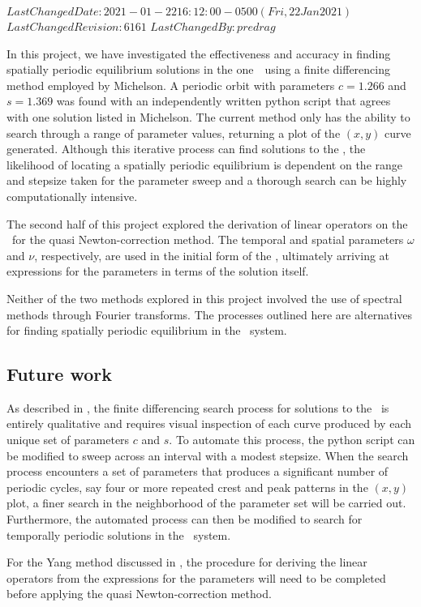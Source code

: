 {$LastChangedDate: 2021-01-22 16:12:00 -0500 (Fri, 22 Jan 2021) $}
{$LastChangedRevision: 6161 $} {$LastChangedBy: predrag $}

In this project, we have investigated the effectiveness and accuracy in
finding spatially periodic equilibrium solutions in the one\dmn\ \KSe\
using a finite differencing method employed by Michelson. A periodic
orbit with parameters $c = 1.266$ and $s = 1.369$ was found with an
independently written python script that agrees with one solution listed
in Michelson\rf{Mks86}. The current method only has the ability to search through
a range of parameter values, returning a plot of the $(x,y)$ curve
generated.
Although this iterative process can find solutions to the \KSe, the
likelihood of locating a spatially periodic equilibrium is dependent on
the range and stepsize taken for the parameter sweep and a thorough
search can be highly computationally intensive.

The second half of this project explored the derivation of linear operators on the \KSe\ for the quasi Newton-correction method. The temporal and spatial parameters $\omega$ and $\nu$, respectively, are used in the initial form of the \KSe, ultimately arriving at expressions for the parameters in terms of the solution itself.

Neither of the two methods explored in this project involved the use of spectral methods through Fourier transforms. The processes outlined here are alternatives for finding spatially periodic equilibrium in the \KS\ system.

\subsection{Future work}

As described in , the finite differencing search process for solutions to the \KSe\ is entirely qualitative and requires visual inspection of each curve produced by each unique set of parameters $c$ and $s$. To automate this process, the python script can be modified to sweep across an interval with a modest stepsize. When the search process encounters a set of parameters that produces a significant number of periodic cycles, say four or more repeated crest and peak patterns in the $(x,y)$ plot, a finer search in the neighborhood of the parameter set will be carried out. Furthermore, the automated process can then be modified to search for temporally periodic solutions in the \KS\ system.

For the Yang method discussed in , the procedure for deriving the linear operators from the expressions for the parameters will need to be completed before applying the quasi Newton-correction method.
